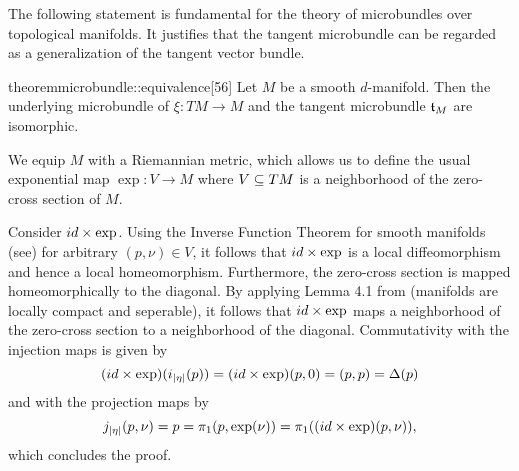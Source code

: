 \begin{myparagraph}
    The following statement is fundamental for the theory of
    microbundles over topological manifolds.
    It justifies that the tangent microbundle can be regarded
    as a generalization of the tangent vector bundle.
\end{myparagraph}

\begin{mystatement}{theorem}{microbundle::equivalence}[56]
    Let $M$ be a smooth $d$-manifold.
    Then the underlying microbundle of $\xi: TM \to M$ and the tangent microbundle $\mathfrak{t}_M$
    are isomorphic. 
\end{mystatement}

\begin{myproof}
    We equip $M$ with a Riemannian metric,
    which allows us to define the usual 
    exponential map $\exp: V \to M$ where $V \subseteq{} TM$ is a neighborhood
    of the zero-cross section of $M$.

    Consider $id \times \exp$.
    Using the Inverse Function Theorem for smooth manifolds (see\cite[thm.4.5]{lee})
    for arbitrary $(p, \nu) \in V$, it follows that $id \times \exp$ is a local diffeomorphism
    and hence a local homeomorphism.
    Furthermore,
    the zero-cross section is mapped homeomorphically to the diagonal.
    By applying Lemma 4.1 from \cite[lm.4.1]{whitehead} (manifolds are locally compact and seperable),
    it follows that $id \times \exp$ maps a neighborhood
    of the zero-cross section to a neighborhood of the diagonal.
    Commutativity with the injection maps is given by
    \[ (id \times \exp)(i_{\vert{} \eta \vert{}}(p)) = (id \times \exp)(p, 0) = (p, p) = \Delta(p) \]
    and with the projection maps by
    \[ j_{\vert{} \eta \vert{}}(p, \nu) = p = \pi_1(p, \exp(\nu)) = \pi_1((id \times \exp)(p, \nu)), \]
    which concludes the proof.
\end{myproof}